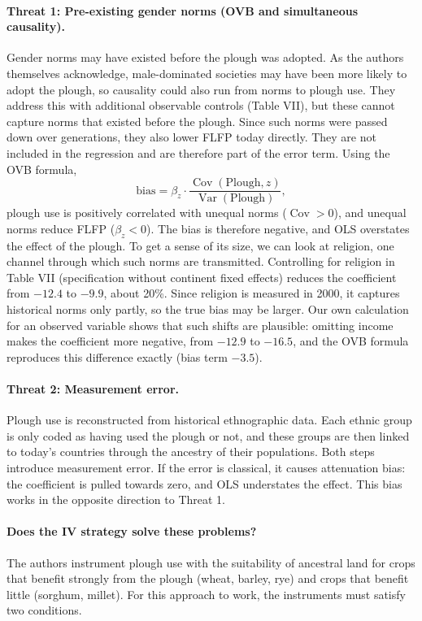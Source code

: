 \documentclass[12pt,a4paper]{article}
\begin{document}
\paragraph{Threat 1: Pre-existing gender norms (OVB and simultaneous causality).}
Gender norms may have existed before the plough was adopted. As the authors themselves acknowledge, male-dominated societies may have been more likely to adopt the plough, so causality could also run from norms to plough use. They address this with additional observable controls (Table VII), but these cannot capture norms that existed before the plough. Since such norms were passed down over generations, they also lower FLFP today directly. They are not included in the regression and are therefore part of the error term. Using the OVB formula,
\[
\text{bias} = \beta_z \cdot \frac{\operatorname{Cov}(\text{Plough}, z)}{\operatorname{Var}(\text{Plough})},
\]
plough use is positively correlated with unequal norms ($\operatorname{Cov} > 0$), and unequal norms reduce FLFP ($\beta_z < 0$). The bias is therefore negative, and OLS overstates the effect of the plough. To get a sense of its size, we can look at religion, one channel through which such norms are transmitted. Controlling for religion in Table VII (specification without continent fixed effects) reduces the coefficient from $-12.4$ to $-9.9$, about 20\%. Since religion is measured in 2000, it captures historical norms only partly, so the true bias may be larger. Our own calculation for an observed variable shows that such shifts are plausible: omitting income makes the coefficient more negative, from $-12.9$ to $-16.5$, and the OVB formula reproduces this difference exactly (bias term $-3.5$).

\paragraph{Threat 2: Measurement error.}
Plough use is reconstructed from historical ethnographic data. Each ethnic group is only coded as having used the plough or not, and these groups are then linked to today's countries through the ancestry of their populations. Both steps introduce measurement error. If the error is classical, it causes attenuation bias: the coefficient is pulled towards zero, and OLS understates the effect. This bias works in the opposite direction to Threat 1.

\paragraph{Does the IV strategy solve these problems?}
The authors instrument plough use with the suitability of ancestral land for crops that benefit strongly from the plough (wheat, barley, rye) and crops that benefit little (sorghum, millet). For this approach to work, the instruments must satisfy two conditions.
\end{document}
